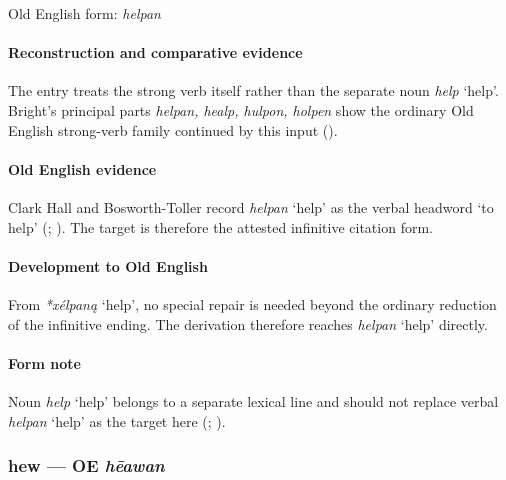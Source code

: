 \documentclass[
  british,
  a4paper,
]{article}
\providecommand{\Recon}[1]{\emph{*#1}}
\begin{document}
Old English form: \emph{helpan}

\paragraph{Reconstruction and comparative
evidence}\label{reconstruction-and-comparative-evidence-32}

The entry treats the strong verb itself rather than the separate noun
{\emph{help}} `help'. Bright's principal parts \emph{helpan, healp,
hulpon, holpen} show the ordinary Old English strong-verb family
continued by this input ().

\paragraph{Old English evidence}\label{old-english-evidence-32}

Clark Hall and Bosworth-Toller record {\emph{helpan}} `help' as the
verbal headword `to help' (; ). The target is therefore the attested infinitive citation form.

\paragraph{Development to Old
English}\label{development-to-old-english-32}

From \Recon{xélpaną} `help', no special repair is needed beyond the
ordinary reduction of the infinitive ending. The derivation therefore
reaches {\emph{helpan}} `help' directly.

\paragraph{Form note}\label{form-note-8}

Noun {\emph{help}} `help' belongs to a separate lexical line and should
not replace verbal {\emph{helpan}} `help' as the target here
(;
).

\subsubsection{\texorpdfstring{hew --- OE
\emph{hēawan}}{hew --- OE hēawan}}\label{hew-oe-hux113awan}
\end{document}
